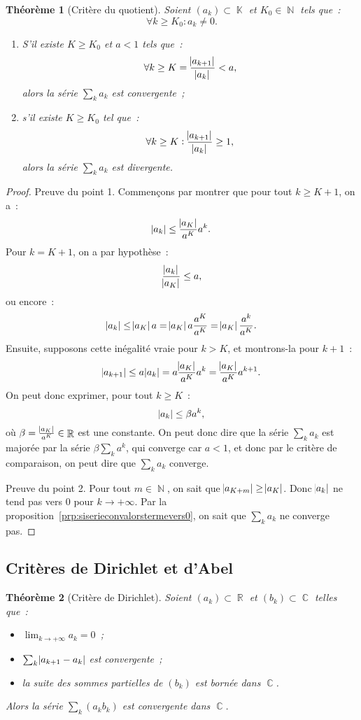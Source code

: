 \documentclass{article}
\DeclareMathOperator{\C}{\mathbb C}
\DeclareMathOperator{\K}{\mathbb K}
\DeclareMathOperator{\N}{\mathbb N}
\DeclareMathOperator{\R}{\mathbb R}
\newtheorem{thm}{Théorème}[section]
\theoremstyle{definition}
\theoremstyle{remark}
\begin{document}
		\begin{thm}[Critère du quotient] Soient $(a_k) \subset \K$ et $K_0 \in \N$ tels que~:
		\[\forall k \geq K_0 : a_k \neq 0.\]

		\begin{enumerate}
			\item S'il existe $K \geq K_0$ et $a < 1$ tels que~:
				\[\forall k \geq K = \frac {\abs {a_{k+1}}}{\abs {a_k}} < a,\]
			alors la série $\sum_k a_k$ est convergente~;
			\item s'il existe $K \geq K_0$ tel que~:
				\[\forall k \geq K : \frac {\abs {a_{k+1}}}{\abs {a_k}} \geq 1,\]
			alors la série $\sum_k a_k$ est divergente.
		\end{enumerate}
		\end{thm}

		\begin{proof} Preuve du point 1. Commençons par montrer que pour tout $k \geq K+1$, on a~:
		\[\abs {a_k} \leq \frac {\abs {a_K}}{a^K}a^k.\]
		Pour $k = K+1$, on a par hypothèse~:
		\[\frac {\abs {a_k}}{\abs {a_K}} \leq a,\]
		ou encore~:
		\[\abs {a_k} \leq \abs {a_K}a = \abs {a_K}a\frac {a^K}{a^K} = \abs{a_K}\frac {a^k}{a^K}.\]
		Ensuite, supposons cette inégalité vraie pour $k > K$, et montrons-la pour $k+1$~:
		\[\abs{a_{k+1}} \leq a\abs{a_k} = a\frac {\abs{a_K}}{a^K}a^k = \frac {\abs {a_K}}{a^K}a^{k+1}.\]
		On peut donc exprimer, pour tout $k \geq K$~:
		\[\abs {a_k} \leq \beta a^k,\]
		où $\beta = \frac {\abs {a_K}}{a^K} \in \R$ est une constante. On peut donc dire que la série $\sum_k a_k$ est majorée par la série $\beta\sum_ka^k$,
		qui converge car $a < 1$, et donc par le critère de comparaison, on peut dire que $\sum_k a_k$ converge.

		Preuve du point 2. Pour tout $m \in \N$, on sait que $\abs {a_{K+m}} \geq \abs {a_K}$. Donc $\abs {a_k}$ ne tend pas vers 0 pour $k \to +\infty$.
		Par la proposition~\ref{prp:siserieconvalorstermevers0}, on sait que $\sum_k a_k$ ne converge pas.
		\end{proof}

	\subsection{Critères de Dirichlet et d'Abel}
		\begin{thm}[Critère de Dirichlet] Soient $(a_k) \subset \R$ et $(b_k) \subset \C$ telles que~:
		\begin{itemize}
			\item[$(i)$]   $\lim_{k \to +\infty} a_k = 0$~;
			\item[$(ii)$]  $\sum_k \abs{a_{k+1}-a_k}$ est convergente~;
			\item[$(iii)$] la suite des sommes partielles de $(b_k)$ est bornée dans $\C$.
		\end{itemize}
		Alors la série $\sum_k (a_kb_k)$ est convergente dans $\C$.
		\end{thm}
\end{document}
